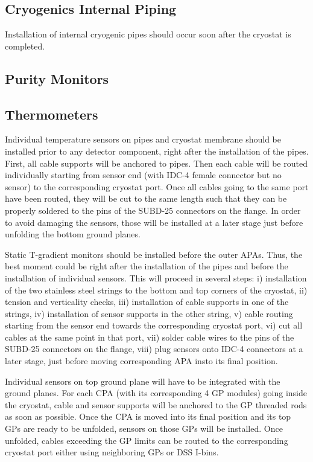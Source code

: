\subsection{Cryogenics Internal Piping}
\label{sec:fdsp-slow-cryo-install-pipes}

Installation of internal cryogenic pipes should occur soon after the cryostat is completed.

\subsection{Purity Monitors}
\label{sec:fdsp-slow-cryo-instal-pm}


\subsection{Thermometers}
\label{sec:fdsp-slow-cryo-instal-th}


Individual temperature sensors on pipes and cryostat membrane should be installed prior to any detector component, right after the installation of the pipes.
First, all cable supports will be anchored to pipes. Then each cable will be routed individually starting from sensor end (with IDC-4 female connector but no sensor)
to the corresponding cryostat port. Once all cables going to the same port have been routed, they will be cut to the same length such that they can be properly soldered
to the pins of the SUBD-25 connectors on the flange. In order to avoid damaging the sensors, those will be installed at a later stage just before unfolding the bottom ground planes.

Static T-gradient monitors should be installed before the outer APAs. Thus, the best moment could be right after the installation of the pipes
and before the installation of individual sensors. This will proceed in several steps: i) installation of the two stainless steel strings to the bottom and top corners of the cryostat,
ii) tension and verticality checks, iii) installation of cable supports in one of the strings, iv) installation of sensor supports in the other string, v) cable routing starting from
the sensor end towards the corresponding cryostat port, vi) cut all cables at the same point in that port, vii) solder cable wires to the pins of the SUBD-25 connectors on the flange,
viii) plug sensors onto IDC-4 connectors at a later stage, just before moving corresponding APA insto its final position. 

Individual sensors on top ground plane will have to be integrated with the ground planes. For each CPA (with its corresponding 4 GP modules)
going inside the cryostat, cable and sensor supports will be anchored to the GP threaded rods as soon as possible.
Once the CPA is moved into its final position and its top GPs are ready to be unfolded, sensors on those GPs will be installed. Once unfolded, cables 
exceeding the GP limits can be routed to the corresponding cryostat port either using neighboring GPs or DSS I-bins. 



